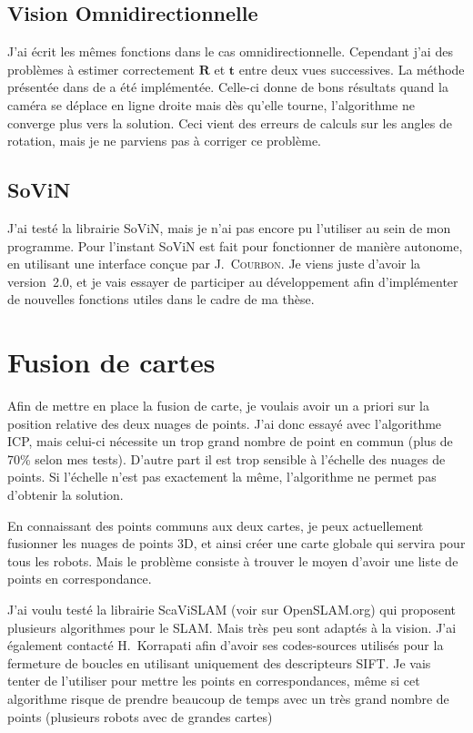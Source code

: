 \documentclass[10pt]{article}
\begin{document}
\subsection{Vision Omnidirectionnelle}

J'ai écrit les mêmes fonctions dans le cas omnidirectionnelle.
Cependant j'ai des problèmes à estimer correctement $\mathbf{R}$ et $\mathbf{t}$ entre deux vues successives.
La méthode présentée dans  de \citeauthor{Puig11PhD} a été implémentée.
Celle-ci donne de bons résultats quand la caméra se déplace en ligne droite mais dès qu'elle tourne, l'algorithme ne converge plus vers la solution.
Ceci vient des erreurs de calculs sur les angles de rotation, mais je ne parviens pas à corriger ce problème.

\subsection{SoViN}

J'ai testé la librairie SoViN, mais je n'ai pas encore pu l'utiliser au sein de mon programme. Pour l'instant SoViN est fait pour fonctionner de manière autonome, en utilisant une interface conçue par J.~\textsc{Courbon}.
Je viens juste d'avoir la version~2.0, et je vais essayer de participer au développement afin d'implémenter de nouvelles fonctions utiles dans le cadre de ma thèse.

\section{Fusion de cartes}

Afin de mettre en place la fusion de carte, je voulais avoir un a priori sur la position relative des deux nuages de points.
J'ai donc essayé avec l'algorithme ICP, mais celui-ci nécessite un trop grand nombre de point en commun (plus de 70\% selon mes tests).
D'autre part il est trop sensible à l'échelle des nuages de points.
Si l'échelle n'est pas exactement la même, l'algorithme ne permet pas d'obtenir la solution.

En connaissant des points communs aux deux cartes, je peux actuellement fusionner les nuages de points 3D, et ainsi créer une carte globale qui servira pour tous les robots.
Mais le problème consiste à trouver le moyen d'avoir une liste de points en correspondance.

J'ai voulu testé la librairie ScaViSLAM (voir sur OpenSLAM.org) qui proposent plusieurs algorithmes pour le SLAM.
Mais très peu sont adaptés à la vision.
J'ai également contacté H.~Korrapati afin d'avoir ses codes-sources utilisés pour la fermeture de boucles en utilisant uniquement des descripteurs SIFT.
Je vais tenter de l'utiliser pour mettre les points en correspondances, même si cet algorithme risque de prendre beaucoup de temps avec un très grand nombre de points (plusieurs robots avec de grandes cartes)
\end{document}
